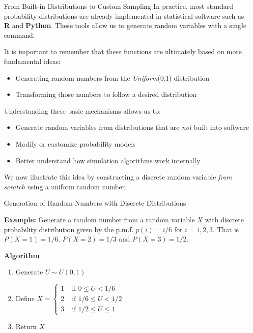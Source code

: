 \documentclass[8pt]{beamer}
\begin{document}
\begin{frame}{From Built-in Distributions to Custom Sampling}
In practice, most standard probability distributions are already implemented in statistical software such as \textbf{R} and \textbf{Python}. These tools allow us to generate random variables with a single command.

\vspace{3mm}

It is important to remember that these functions are ultimately based on more fundamental ideas:
\begin{itemize}
  \item Generating random numbers from the \emph{Uniform}(0,1) distribution
  \item Transforming those numbers to follow a desired distribution
\end{itemize}

\vspace{3mm}

Understanding these basic mechanisms allows us to:
\begin{itemize}
  \item Generate random variables from distributions that are \emph{not} built into software
  \item Modify or customize probability models
  \item Better understand how simulation algorithms work internally
\end{itemize}

\vspace{3mm}

We now illustrate this idea by constructing a discrete random variable \emph{from scratch} using a uniform random number.
\end{frame}

\begin{frame}{Generation of Random Numbers with Discrete Distributions}
\vspace{2mm}

{\bf Example:} Generate a random number from a random variable $X$ with discrete probability distribution given by the p.m.f.  $p(i)=i/6$ for $i=1,2,3$. That is $P(X=1)=1/6$,
$P(X=2)=1/3$ and $P(X=3)=1/2$.
\vspace{2mm}

{\bf Algorithm}
\vspace{2mm}

\begin{enumerate}
\item Generate $U\sim U(0,1)$
\item Define $X=\left\{   
\begin{array}{ll} 
1 &  \text { if } 0 \leq U<1/6\\
2 &  \text { if }   1/6 \leq U<1/2\\ 
3 &  \text { if }   1/2 \leq U \leq 1  
\end{array}  
\right. $
\item Return $X$
\end{enumerate}
\end{frame}
\end{document}
